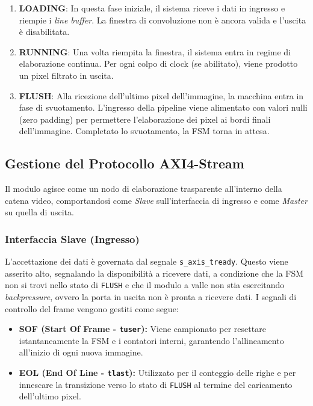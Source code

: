 \begin{enumerate}
	\item \textbf{LOADING}: In questa fase iniziale, il sistema riceve i dati in ingresso e riempie i \textit{line buffer}. La finestra di convoluzione non è ancora valida e l'uscita è disabilitata.
	\item \textbf{RUNNING}: Una volta riempita la finestra, il sistema entra in regime di elaborazione continua. Per ogni colpo di clock (se abilitato), viene prodotto un pixel filtrato in uscita.
	\item \textbf{FLUSH}: Alla ricezione dell'ultimo pixel dell'immagine, la macchina entra in fase di svuotamento. L'ingresso della pipeline viene alimentato con valori nulli (zero padding) per permettere l'elaborazione dei pixel ai bordi finali dell'immagine. Completato lo svuotamento, la FSM torna in attesa.
\end{enumerate}

\subsection{Gestione del Protocollo AXI4-Stream}
Il modulo agisce come un nodo di elaborazione trasparente all'interno della catena video, comportandosi come \textit{Slave} sull'interfaccia di ingresso e come \textit{Master} su quella di uscita.

\subsubsection{Interfaccia Slave (Ingresso)}
L'accettazione dei dati è governata dal segnale \texttt{s\_axis\_tready}. Questo viene asserito alto, segnalando la disponibilità a ricevere dati, a condizione che la FSM non si trovi nello stato di \texttt{FLUSH} e che il modulo a valle non stia esercitando \textit{backpressure}, ovvero la porta in uscita non è pronta a ricevere dati.
I segnali di controllo del frame vengono gestiti come segue:
\begin{itemize}
	\item \textbf{SOF (Start Of Frame - \texttt{tuser}):} Viene campionato per resettare istantaneamente la FSM e i contatori interni, garantendo l'allineamento all'inizio di ogni nuova immagine.
	\item \textbf{EOL (End Of Line - \texttt{tlast}):} Utilizzato per il conteggio delle righe e per innescare la transizione verso lo stato di \texttt{FLUSH} al termine del caricamento dell'ultimo pixel.
\end{itemize}

